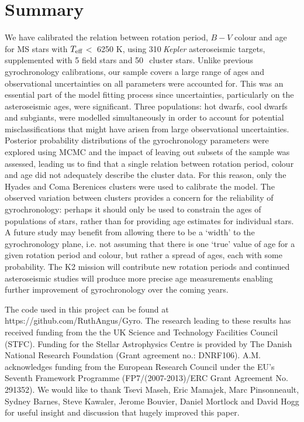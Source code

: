 \documentclass[11pt,preprint]{aastex}
\newcommand{\teff}{$T_{\rm{eff}}$}
\newcommand{\nastero}{310}
\newcommand{\nHC}{50~}
\begin{document}
\section{Summary}
\label{sec:conclusions}

We have calibrated the relation between rotation period, $B-V$ colour and age
for MS stars with \teff$<$ 6250 K, using \nastero$~${\it Kepler} asteroseismic
targets, supplemented with 5 field stars and \nHC$~$cluster stars.
Unlike previous gyrochronology calibrations, our sample covers a large range
of ages and observational uncertainties on all parameters were accounted for.
This was an essential part of the model fitting process since
uncertainties, particularly on the asteroseismic ages, were significant.
Three populations: hot dwarfs, cool dwarfs and subgiants, were modelled
simultaneously in order to account for potential misclassifications that
might have arisen from large observational uncertainties.
Posterior probability distributions of the gyrochronology parameters were
explored using MCMC and the impact of leaving out subsets of the sample was
assessed, leading us to find that a single relation between rotation period,
colour and age did not adequately describe the cluster data.
For this reason, only the Hyades and Coma Berenices clusters were used to
calibrate the model.
The observed variation between clusters provides a concern for the reliability
of gyrochronology: perhaps it should only be used to constrain the ages of
populations of stars, rather than for providing age estimates for individual
stars.
A future study may benefit from allowing there to be a `width' to the
gyrochronology plane, i.e. not assuming that there is one `true' value of age
for a given rotation period and colour, but rather a spread of ages, each with
some probability.
The K2 mission will contribute new rotation periods and continued
asteroseismic studies will produce more precise age measurements enabling
further improvement of gyrochronology over the coming years.

The code used in this project can be found at
https://github.com/RuthAngus/Gyro.
The research leading to these results has received funding from the the UK
Science and Technology Facilities Council (STFC).
Funding for the Stellar Astrophysics Centre is provided by The Danish National
Research Foundation (Grant agreement no.: DNRF106).
A.M. acknowledges funding from the European Research Council under the EU’s
Seventh Framework Programme (FP7/(2007-2013)/ERC Grant Agreement No. 291352).
We would like to thank Tsevi Maseh, Eric Mamajek, Marc Pinsonneault, Sydney
Barnes, Steve Kawaler, Jerome Bouvier, Daniel Mortlock and David Hogg for
useful insight and discussion that hugely improved this paper.
\end{document}
